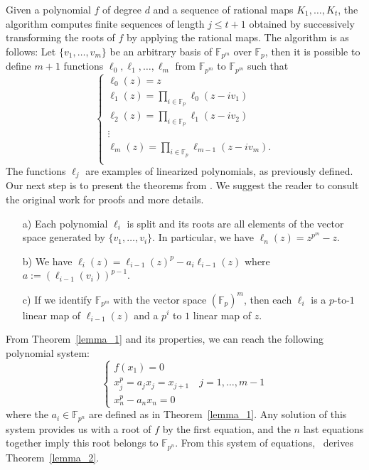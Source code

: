 Given a polynomial $f$ of degree $d$ and a sequence of rational maps $K_1,\ldots, K_t$, the algorithm computes finite sequences of length $j \leq t+1$ obtained by successively transforming the roots of $f$ by applying the rational maps. The algorithm is as follows: Let $\{v_1,\ldots,v_m\}$ be an arbitrary basis of $\mathbb{F}_{p^m}$ over $\mathbb{F}_p$, then it is possible to define $m+1$ functions $\ell_0, \ell_1,\ldots, \ell_m$ from $\mathbb{F}_{p^m}$ to $\mathbb{F}_{p^m}$ such that
$$
\left \{
\begin{array}{l}
     \ell_0(z) = z\\
     \ell_1(z) = \prod_{i\in \mathbb{F}_p}\ell_0(z-iv_1)\\
     \ell_2(z) = \prod_{i\in \mathbb{F}_p}\ell_1(z-iv_2)\\
     \vdots \\
     \ell_m(z) = \prod_{i\in \mathbb{F}_p}\ell_{m-1}(z-iv_m).\\
\end{array}
\right.
$$
The functions $\ell_j$ are examples of linearized polynomials, as previously defined. Our next step is to present the theorems from \cite{petit2014finding}. We suggest the reader to consult the original work for proofs and more details.
\begin{theorem}\label{lemma_1}
\begin{itemize}
    \item[a)] Each polynomial $\ell_i$ is split and its roots are all elements of the vector space generated by $\{v_1, \ldots,v_i\}$. In particular, we have $\ell_n(z) = z^{p^m} -z$.
    \item[b)] We have $\ell_i(z)  = \ell_{i-1}(z)^p - a_i\ell_{i-1}(z)$ where $a := (\ell_{i-1}(v_i))^{p-1}$.
    \item[c)] If we identify $\mathbb{F}_{p^m}$ with the vector space $(\mathbb{F}_p)^m$, then each $\ell_i$ is a $p$-to-$1$ linear map of $\ell_{i-1}(z)$ and a $p^i$ to $1$ linear map of $z$.
\end{itemize}
\end{theorem}

From Theorem~\ref{lemma_1} and its properties, we can reach the following polynomial system:
\begin{equation}\label{eq:system_1}
    \left \{
\begin{array}{l}
    f(x_1) = 0\\
     x_j^p = a_jx_j = x_{j+1} \quad j=1,\ldots, m-1\\
     x_n^p - a_nx_n = 0
\end{array}
\right.
\end{equation}
where the $a_i \in \mathbb{F}_{p^n}$ are defined as in Theorem~\ref{lemma_1}. Any solution of this system provides us with a root of $f$ by the first equation, and the $n$ last equations together imply this root belongs to $\mathbb{F}_{p^n}$. From this system of equations,~\cite{petit2014finding} derives Theorem~\ref{lemma_2}.

